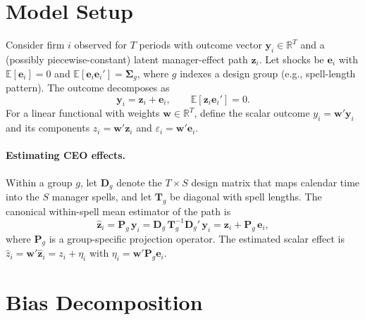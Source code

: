 \documentclass[11pt,a4paper]{article}
\begin{document}
\section{Model Setup}
Consider firm $i$ observed for $T$ periods with outcome vector $\mathbf y_i \in \mathbb R^T$ and a (possibly piecewise-constant) latent manager-effect path $\mathbf z_i$. Let shocks be $\mathbf e_i$ with $\mathbb E[\mathbf e_i]=0$ and $\mathbb E[\mathbf e_i\mathbf e_i']=\boldsymbol\Sigma_g$, where $g$ indexes a design group (e.g., spell-length pattern). The outcome decomposes as
\begin{equation}
\mathbf y_i = \mathbf z_i + \mathbf e_i,\qquad \mathbb E[\mathbf z_i\mathbf e_i']=0.
\end{equation}
For a linear functional with weights $\mathbf w\in\mathbb R^T$, define the scalar outcome $y_i=\mathbf w'\mathbf y_i$ and its components $z_i=\mathbf w'\mathbf z_i$ and $\varepsilon_i=\mathbf w'\mathbf e_i$.

\paragraph{Estimating CEO effects.} Within a group $g$, let $\mathbf D_g$ denote the $T\times S$ design matrix that maps calendar time into the $S$ manager spells, and let $\mathbf T_g$ be diagonal with spell lengths. The canonical within-spell mean estimator of the path is
\begin{equation}
\hat{\mathbf z}_i = \mathbf P_g\,\mathbf y_i = \mathbf D_g\,\mathbf T_g^{-1}\mathbf D_g'\,\mathbf y_i = \mathbf z_i + \mathbf P_g\,\mathbf e_i,
\end{equation}
where $\mathbf P_g$ is a group-specific projection operator. The estimated scalar effect is $\hat z_i = \mathbf w'\hat{\mathbf z}_i = z_i + \eta_i$ with $\eta_i=\mathbf w'\mathbf P_g\mathbf e_i$.

\section{Bias Decomposition}\label{sec:bias}
\end{document}
